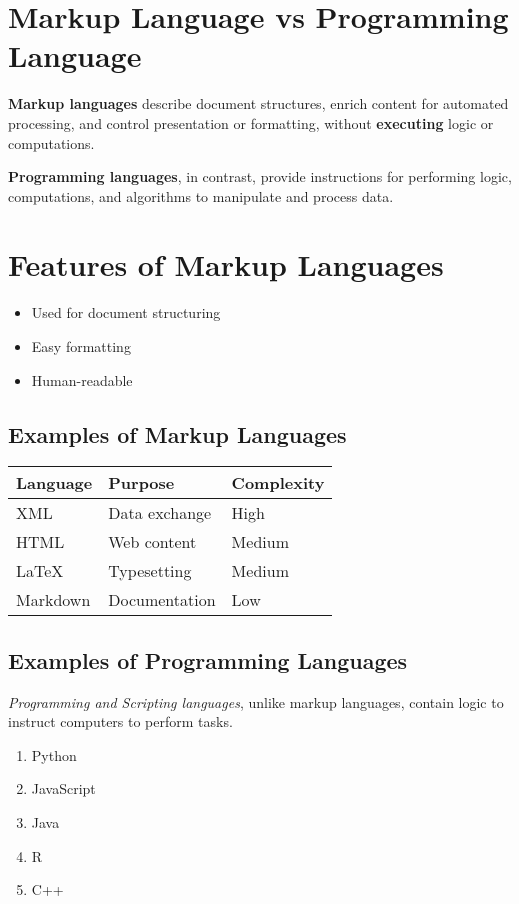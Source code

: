 \documentclass{article}
\begin{document}
\section*{Markup Language vs Programming Language}

\textbf{Markup languages} describe document structures, enrich content for automated processing, and control presentation or formatting, without \textbf{executing} logic or computations.

\textbf{Programming languages}, in contrast, provide instructions for performing logic, computations, and algorithms to manipulate and process data.

\section{Features of Markup Languages}

\begin{itemize}
    \item Used for document structuring
    \item Easy formatting
    \item Human-readable
\end{itemize}

\subsection{Examples of Markup Languages}

\begin{tabular}{|l|l|l|}
\hline
\textbf{Language} & \textbf{Purpose} & \textbf{Complexity} \\
\hline
XML & Data exchange & High \\
HTML & Web content & Medium \\
LaTeX & Typesetting & Medium \\
Markdown & Documentation & Low \\
\hline
\end{tabular}

\subsection{Examples of Programming Languages}

\textit{Programming and Scripting languages}, unlike markup languages, contain logic to instruct computers to perform tasks.

\begin{enumerate}
    \item Python
    \item JavaScript
    \item Java
    \item R
    \item C++
\end{enumerate}
\end{document}
